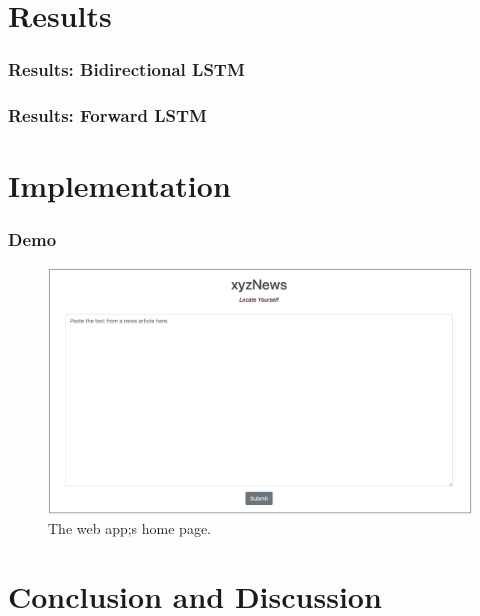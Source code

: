 \documentclass{beamer}
\begin{document}

\section{Results}

    \begin{frame}
    	\frametitle{Results: Bidirectional LSTM}
    	
    \end{frame}

    \begin{frame}
    	\frametitle{Results: Forward LSTM}
		
    \end{frame}


\section{Implementation}

     \begin{frame}
    	\frametitle{Demo}
    	\begin{figure}[H]
    		\includegraphics[width=\textwidth]{figures/images/web-form.png}
    		\caption{The web app;s home page.}
    		\label{fig:form}
    	\end{figure}
    \end{frame}



\section{Conclusion and Discussion}
\end{document}
